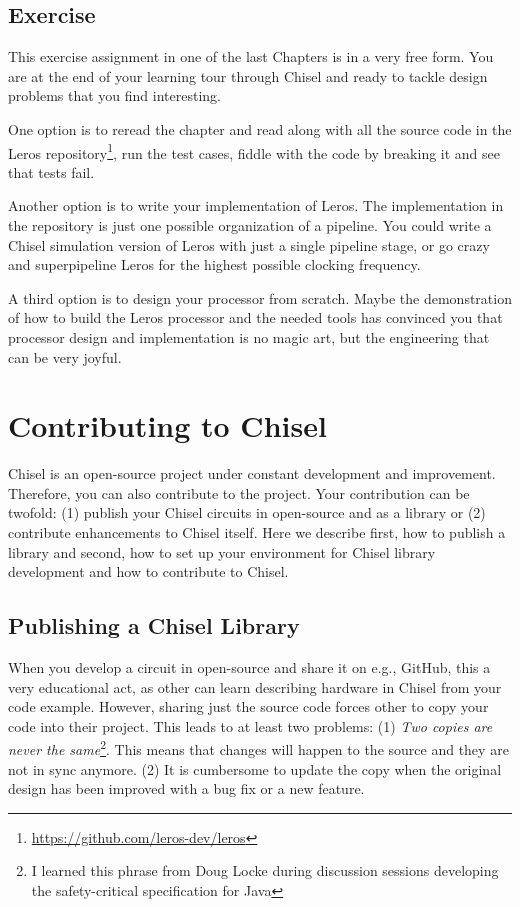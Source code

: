 \documentclass[%
    10pt,
    headinclude, footexclude,
    openright, %
    notitlepage,
    cleardoubleempty,
    headsepline,
    pointlessnumbers,
    bibtotoc, idxtotoc,
    ]{scrbook}
\newcommand{\myref}[2]{\href{#1}{#2}}
\renewcommand{\myref}[2]{{#2}{\footnote{\url{#1}}}}
\begin{document}

\section{Exercise}

This exercise assignment in one of the last Chapters is in a very free form. You are at the end
of your learning tour through Chisel and ready to tackle design problems that
you find interesting.

One option is to reread the chapter and read along with all the source code in the
\myref{https://github.com/leros-dev/leros}{Leros repository}, run the test cases,
fiddle with the code by breaking it and see that tests fail.

Another option is to write your implementation of Leros.
The implementation in the repository is just one possible organization of a pipeline.
You could write a Chisel simulation version of Leros with just a single pipeline stage,
or go crazy and superpipeline Leros for the highest possible clocking frequency.

A third option is to design your processor from scratch. Maybe the demonstration of
how to build the Leros processor and the needed tools has convinced you that processor
design and implementation is no magic art, but the engineering that can be very joyful.

\chapter{Contributing to Chisel}


Chisel is an open-source project under constant development and improvement.
Therefore, you can also contribute to the project. Your contribution can be twofold:
(1) publish your Chisel circuits in open-source and as a library or (2) contribute
enhancements to Chisel itself.
Here we describe first, how to publish a library and second, how to
set up your environment for Chisel library development and how to contribute
to Chisel.

\section{Publishing a Chisel Library}

When you develop a circuit in open-source and share it on e.g., GitHub,
this a very educational act, as other can learn describing hardware in Chisel from your code example.
However, sharing just the source code forces other to copy your code into their
project. This leads to at least two problems: (1) \emph{Two copies are never the
same}\footnote{I learned this phrase from Doug Locke during discussion sessions
developing the safety-critical specification for Java}. This means that changes will
happen to the source and they are not in sync anymore.
(2) It is cumbersome to update the copy when the original design has been improved
with a bug fix or a new feature.
\end{document}

